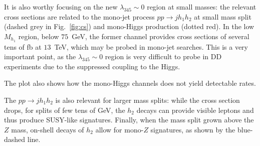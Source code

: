 \documentclass[12pt,a4paper]{article}
\newcommand {\blue} {\color{blue}}
\newcommand {\red} {\color{red}}
\begin{document}

{\blue It is also worthy focusing on the new $\lambda_{345}\sim 0$ region at small masses: the relevant cross sections are related to the mono-jet process $p p \to j h_1 h_2$ at small mass split (dashed grey in Fig.~\ref{fig:cs}) and mono-Higgs production (dotted red).
In the low $M_{h_1}$ region, below $75$~GeV, the former channel provides cross sections of several tens of fb at $13$~TeV, which may be probed in mono-jet searches. This is a very important point, as the $\lambda_{345}\sim 0$ region is very difficult to probe in DD experiments due to the suppressed coupling to the Higgs.

The plot also shows how the mono-Higgs channels does not yield detectable rates.

The $p p \to j h_1 h_2$ is also relevant for larger mass splits: while the cross section drops, for splits of few tens of GeV, the $h_2$ decays can provide visible leptons and thus produce SUSY-like signatures. Finally, when the mass split grown above the $Z$ mass, on-shell decays of $h_2$ allow for mono-$Z$ signatures, as shown by the blue-dashed line.
}
\end{document}

